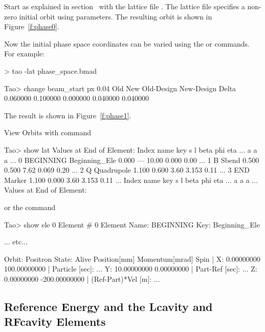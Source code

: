 \documentclass{hitec}
\begin{document}
Start \tao as explained in section~ with the lattice file . The
lattice file specifies a non-zero initial orbit using  parameters. The resulting
orbit is shown in Figure~\ref{f:phase0}.

Now the initial phase space coordinates can be varied using the  or 
commands. For example:
\begin{code}
> tao -lat phase_space.bmad

Tao> change beam_start px 0.04
           Old           New    Old-Design    New-Design         Delta
      0.060000      0.100000      0.000000      0.040000      0.040000  
\end{code}

The result is shown in Figure~\ref{f:phase1}.

View Orbits with  command

\begin{code}
Tao> show lat
      Values at End of Element:
 Index  name      key                 s       l    beta     phi    eta ...
                                                      a       a      a ...
     0  BEGINNING Beginning_Ele   0.000     ---   10.00   0.000   0.00 ...
     1  B         Sbend           0.500   0.500    7.62   0.069   0.20 ...
     2  Q         Quadrupole      1.100   0.600    3.60   3.153   0.11 ...
     3  END       Marker          1.100   0.000    3.60   3.153   0.11 ...
 Index  name      key                 s       l    beta     phi    eta ...
                                                      a       a      a ...
      Values at End of Element:
\end{code}

or the  command

\begin{code}
Tao> show ele 0
 Element #                0
 Element Name: BEGINNING
 Key: Beginning_Ele

... etc...

Orbit:  Positron   State: Alive
         Position[mm] Momentum[mrad]        Spin   |
  X:       0.00000000   100.00000000               | Particle [sec]:     ...
  Y:      10.00000000     0.00000000               | Part-Ref [sec]:     ...
  Z:       0.00000000  -200.00000000               | (Ref-Part)*Vel [m]: ...
\end{code}

\subsection{Reference Energy and the Lcavity and RFcavity Elements}
\end{document}
